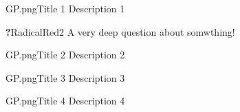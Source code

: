 \documentclass[portrait,a0,final]{a0poster}
\begin{document}
\begin{center}
\begin{minipage}{0.9\linewidth}
    \vspace{2cm}
    \begin{minipage}{0.47\linewidth}
      \begin{section}{GP.png}{Title 1}
        Description 1
      \end{section}

      \begin{gbox}{\textbf{{\LARGE ?}}}{RadicalRed2}
        {\Large A very deep question about somwthing!}
      \end{gbox}


      \begin{section}{GP.png}{Title 2}
        Description 2
      \end{section}
    \end{minipage}\hfill
    \begin{minipage}{0.47\linewidth}
      \begin{section}{GP.png}{Title 3}
        Description 3
      \end{section}
      \begin{section}{GP.png}{Title 4}
        Description 4
      \end{section}
    \end{minipage}
  \end{minipage}
\end{center}
\end{document}
